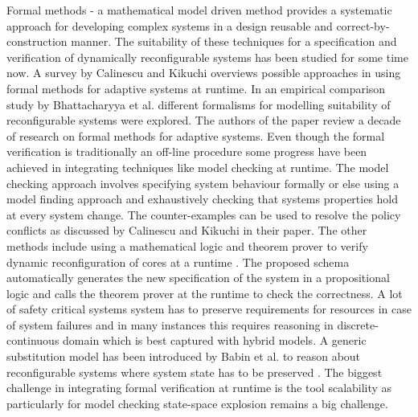 \documentclass[conference]{IEEEtran}
\begin{document}


Formal methods - a mathematical model driven method provides a systematic approach
for developing complex systems in a design reusable and correct-by-construction
manner. The suitability of these techniques for a specification and verification of
dynamically reconfigurable systems has been studied for some time now. A survey by
Calinescu and Kikuchi \cite{calinescu2010formal} overviews possible approaches in
using formal methods for adaptive systems at runtime. In an empirical comparison
study by Bhattacharyya et al. \cite{DBLP:journals/corr/BhattacharyyaMP16}  different
formalisms for modelling suitability of reconfigurable systems were explored. The authors of the paper
\cite{Weyns:2012:SFM:2347583.2347592} review a decade of research on formal
methods for adaptive systems. Even though the formal verification is traditionally
an off-line procedure some progress have been achieved in integrating techniques like
model checking at runtime. The model checking approach involves specifying system behaviour
formally or else using a model finding approach \cite{kikuchi2010configuration}
and exhaustively checking that systems properties hold at every system change.
The counter-examples can be used to resolve the policy conflicts as discussed by
Calinescu and Kikuchi in their paper. The other methods include using a mathematical logic and theorem prover
to verify dynamic reconfiguration of cores at a runtime \cite{singh1999formal}. The proposed schema
automatically generates the new specification of the system in a propositional logic and calls
the theorem prover at the runtime to check the correctness. A lot of safety critical systems
system has to preserve requirements for resources in case of system failures and in many instances this requires
reasoning in discrete-continuous domain which is best captured with hybrid models.
A generic substitution model has been introduced by Babin et al. to reason about reconfigurable
systems where system state has to be preserved \cite{Babin2016}. The biggest challenge in
integrating formal verification at runtime is the tool scalability as particularly for
model checking state-space explosion remains a big challenge.
\end{document}
